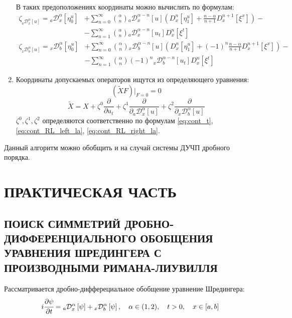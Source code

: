 \documentclass[a4paper, fontsize=14pt]{article}
\newcommand{\RLD}[3]{{}_{#1}\mathcal{D}_{#2}^{\alpha} \left[#3\right]} %
\newcommand{\D}[3]{D_{#1}^{#2} \left[ #3 \right]} %
\newcommand{\RLDa}[4]{{}_{#1}\mathcal{D}_{#2}^{#4} \left[#3\right]} %
\begin{document}
\begin{enumerate}
В таких предоположениях координаты можно вычислить по формулам:
\begin{equation}
  \label{eq:cont_RL_left_la}
  \begin{split}\zeta_{\RLD{a}{x}{u}} = \RLD{a}{x}{\eta^u_0} &+ \sum_{n=0}^{\infty} \binom{\alpha}{n} \RLDa{a}{x}{u}{\alpha - n}  \left( \D{x}{n}{\eta^u_1} + \frac{n-\alpha}{n+1} \D{x}{n+1}{\xi^x} \right)- \\
    &- \sum_{n=1}^{\infty} \binom{\alpha}{n} \RLDa{a}{x}{u_t}{\alpha-n} \D{x}{n}{\xi^t}
  \end{split}
\end{equation}
\begin{equation}
  \label{eq:cont_RL_right_la}
  \begin{split}\zeta_{\RLD{x}{b}{u}} = \RLD{x}{b}{\eta^u_0} &+ \sum_{n=0}^{\infty} \binom{\alpha}{n} \RLDa{x}{b}{u}{\alpha - n} \left( \D{x}{n}{\eta^u_1} + (-1)^n \frac{n-\alpha}{n+1}  \D{x}{n+1}{\xi^x} \right)- \\
    &- \sum_{n=1}^{\infty} \binom{\alpha}{n} (-1)^n \RLDa{x}{b}{u_t}{\alpha-n} \D{x}{n}{\xi^t}
  \end{split}
\end{equation}
  \item Координаты допускаемых операторов ищутся из определяющего уравнения:
  \begin{equation*}
    (\tilde{X}F)\bigg|_{F=0} = 0
  \end{equation*}
  $$\tilde{X} = X + \zeta^0 \frac{\partial}{\partial u_t} + \zeta^1 \frac{\partial}{\partial \RLD{a}{x}{u}}+ \zeta^2 \frac{\partial}{\partial \RLD{x}{b}{u}}$$ $\zeta^0, \zeta^1, \zeta^2$ определяются соответственно по формулам \eqref{eq:cont_t}, \eqref{eq:cont_RL_left_la}, \eqref{eq:cont_RL_right_la}.
\end{enumerate}

Данный алгоритм можно обобщить и на случай системы ДУЧП дробного порядка.
\section[Практическая часть]{ПРАКТИЧЕСКАЯ ЧАСТЬ}
\subsection[Поиск симметрий дробно-дифференциального обобщения уравнения Шредингера с производными Римана-Лиувилля]{ПОИСК СИММЕТРИЙ ДРОБНО-ДИФФЕРЕНЦИАЛЬНОГО ОБОБЩЕНИЯ УРАВНЕНИЯ ШРЕДИНГЕРА С ПРОИЗВОДНЫМИ РИМАНА-ЛИУВИЛЛЯ}

Рассматривается дробно-дифферециальное обобщение уравнение Шредингера:
\begin{equation}
  \label{eq:shredinger_RL_inline}
  i \cfrac{\partial \psi}{\partial t} = \RLD{a}{x}{\psi} + \RLD{x}{b}{\psi}, \quad \alpha \in (1, 2), \quad t > 0, \quad x \in [a, b]
\end{equation}
\end{document}
